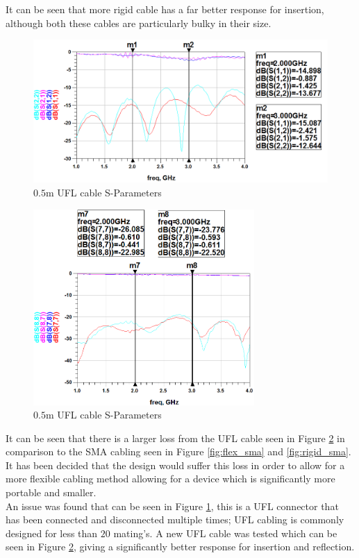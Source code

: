 \documentclass[12pt,openany,a4paper]{book}
\begin{document}
It can be seen that more rigid cable has a far better response for insertion, although both these cables are particularly bulky in their size. 

\begin{figure}[H]
	\centering
	\includegraphics[width=1\textwidth]{UFL-res.png}
	\caption{$0.5$m UFL cable S-Parameters}
	\label{fig:ufl_sma-bad}
\end{figure} 
\begin{figure}[H]
	\centering
	\includegraphics[width=0.75\textwidth]{UFL-short-res.png}
	\caption{$0.5$m UFL cable S-Parameters}
	\label{fig:ufl_sma}
\end{figure} 
It can be seen that there is a larger loss from the UFL cable seen in Figure \ref{fig:ufl_sma} in comparison to the SMA cabling seen in Figure \ref{fig:flex_sma} and \ref{fig:rigid_sma}. It has been decided that the design would suffer this loss in order to allow for a more flexible cabling method allowing for a device which is significantly more portable and smaller. \\
An issue was found that can be seen in Figure \ref{fig:ufl_sma-bad}, this is a UFL connector that has been connected and disconnected multiple times; UFL cabling is commonly designed for less than $20$ mating's. A new UFL cable was tested which can be seen in Figure \ref{fig:ufl_sma}, giving a significantly better response for insertion and reflection.
\end{document}
